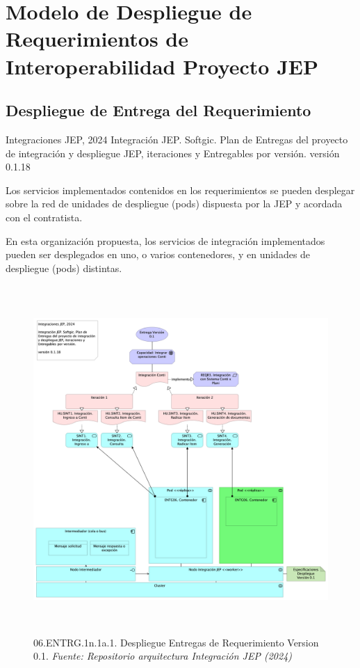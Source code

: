 \documentclass[
  paper=a4,
  ,captions=tableheading
]{scrartcl}
\renewenvironment{quote}{\begin{customblockquote}\list{}{\rightmargin=0em\leftmargin=0em}%
\item\relax\color{blockquote-text}\ignorespaces}{\unskip\unskip\endlist\end{customblockquote}}
\begin{document}
\newpage

\section{Modelo de Despliegue de Requerimientos de Interoperabilidad
Proyecto
JEP}\label{sec:modelo-de-despliegue-de-requerimientos-de-interoperabilidad-proyecto-jep}

\subsection{Despliegue de Entrega del
Requerimiento}\label{sec:despliegue-de-entrega-del-requerimiento}

\begin{quote}
Integraciones JEP, 2024 Integración JEP. Softgic. Plan de Entregas del
proyecto de integración y despliegue JEP, iteraciones y Entregables por
versión. versión 0.1.18
\end{quote}

Los servicios implementados contenidos en los requerimientos se pueden
desplegar sobre la red de unidades de despliegue (pods) dispuesta por la
JEP y acordada con el contratista.

En esta organización propuesta, los servicios de integración
implementados pueden ser desplegados en uno, o varios contenedores, y en
unidades de despliegue (pods) distintas.

\begin{figure}
\centering
\includegraphics[width=\textwidth,height=5.20833in]{images/06.ENTRG.1n.1a.1.DespliegueEntregasdeRequerimientoVersion0.1.png}
\caption{06.ENTRG.1n.1a.1. Despliegue Entregas de Requerimiento Version
0.1. \emph{Fuente: Repositorio arquitectura Integración JEP
(2024)}}\label{fig:id-203e737545e449e59334b47d3034d956}
\end{figure}
\end{document}
